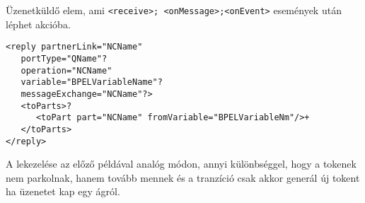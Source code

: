 Üzenetküldő elem, ami \texttt{<receive>; <onMessage>;<onEvent>} események után léphet akcióba. 
\begin{verbatim}
<reply partnerLink="NCName"
   portType="QName"?
   operation="NCName"
   variable="BPELVariableName"?
   messageExchange="NCName"?>
   <toParts>?
      <toPart part="NCName" fromVariable="BPELVariableNm"/>+
   </toParts>
</reply>
\end{verbatim}
A lekezelése az előző példával analóg módon, annyi különbséggel, hogy a tokenek nem parkolnak, hanem tovább mennek és a tranzíció csak akkor generál új tokent ha üzenetet kap egy ágról.
